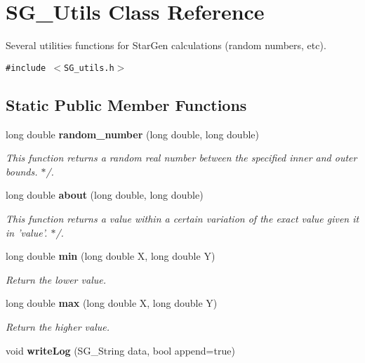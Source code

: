 \section{SG\_\-Utils Class Reference}
\label{class_s_g___utils}
Several utilities functions for Star\-Gen calculations (random numbers, etc).  


{\tt \#include $<$SG\_\-utils.h$>$}

\subsection*{Static Public Member Functions}
\begin{CompactItemize}
\item 
long double {\bf random\_\-number} (long double, long double)\label{class_s_g___utils_e0}

\begin{CompactList}\small\item\em This function returns a random real number between the specified inner and outer bounds. $\ast$/. \item\end{CompactList}\item 
long double {\bf about} (long double, long double)\label{class_s_g___utils_e1}

\begin{CompactList}\small\item\em This function returns a value within a certain variation of the exact value given it in 'value'. $\ast$/. \item\end{CompactList}\item 
long double {\bf min} (long double X, long double Y)\label{class_s_g___utils_e3}

\begin{CompactList}\small\item\em Return the lower value. \item\end{CompactList}\item 
long double {\bf max} (long double X, long double Y)\label{class_s_g___utils_e4}

\begin{CompactList}\small\item\em Return the higher value. \item\end{CompactList}\item 
void {\bf write\-Log} (SG\_\-String data, bool append=true)\label{class_s_g___utils_e5}


\end{CompactItemize}
